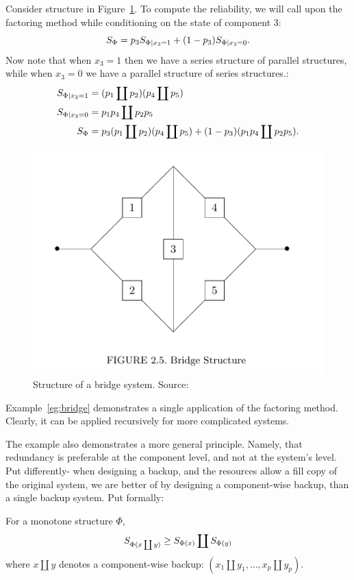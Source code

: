 \begin{example}
\label{eg:bridge}
Consider structure in Figure~\ref{fig:bridge}.
To compute the reliability, we will call upon the factoring method while conditioning on the state of component $3$:
$$ S_\Phi= p_3  S_{\Phi|x_3=1} + (1-p_3) S_{\Phi|x_3=0}   .$$
Now note that when $x_3=1$ then we have a series structure of parallel structures, while when $x_3=0$ we have a parallel structure of series structures.:
\begin{align*}
	S_{\Phi|x_3=1} &= (p_1 \coprod p_2) (p_4 \coprod p_5)\\
	S_{\Phi|x_3=0} &=  p_1 p_4 \coprod p_2 p_5 \\
	S_\Phi &= p_3  (p_1 \coprod p_2) (p_4 \coprod p_5) + (1-p_3) (p_1 p_4 \coprod p_2 p_5).
\end{align*}

\begin{figure}[ht]
\centering
\includegraphics[width=0.5\linewidth]{art/bridge}
\caption{Structure of a bridge system. Source: \cite[Fig.2.5]{aven_stochastic_1999}}
\label{fig:bridge}
\end{figure}

\end{example}
Example~\ref{eg:bridge} demonstrates a single application of the factoring method. Clearly, it can be applied recursively for more complicated systems.

The example also demonstrates a more general principle. Namely, that redundancy is preferable at the component level, and not at the system's level.
Put differently- when designing a backup, and the resources allow a fill copy of the original system, we are better of by designing a component-wise backup, than a single backup system.
Put formally:
\begin{theorem}
For a monotone structure $\Phi$, 
\begin{align}
	S_{\Phi(x \coprod y)} \geq S_{\Phi(x)} \coprod S_{\Phi(y)}
\end{align}
where $x \coprod y$ denotes a component-wise backup: $(x_1 \coprod y_1,\dots,x_p \coprod y_p)$.
\end{theorem}



